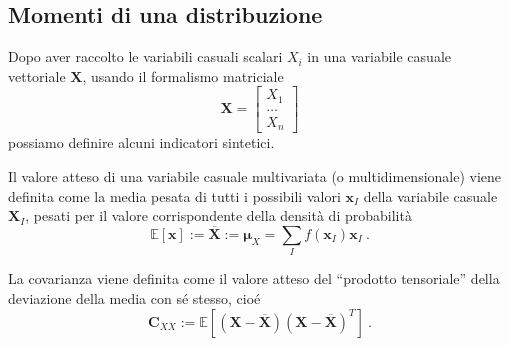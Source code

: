\subsection{Momenti di una distribuzione}
Dopo aver raccolto le variabili casuali scalari $X_i$ in una variabile casuale vettoriale $\mathbf{X}$, usando il formalismo matriciale
\begin{equation}
    \mathbf{X} = \begin{bmatrix}  X_1 \\ \dots  \\ X_n \end{bmatrix}
\end{equation}
possiamo definire alcuni indicatori sintetici. 

\begin{definition}
Il valore atteso di una variabile casuale multivariata (o multidimensionale) viene definita come la media pesata di tutti i possibili valori $\mathbf{x}_I$ della variabile casuale $\mathbf{X}_I$, pesati per il valore corrispondente della densità di probabilità
\begin{equation}
    \mathbb{E}[\mathbf{x}] := \overline{\mathbf{X}} := \mathbf{\mu}_X = \sum_{I} f(\mathbf{x}_I) \mathbf{x}_I \ . 
\end{equation}
\end{definition}

\begin{definition}[Covarianza]
La covarianza viene definita come il valore atteso del ``prodotto tensoriale'' della deviazione della media con sé stesso, cioé
\begin{equation}
    \mathbf{C}_{XX} := \mathbb{E}[(\mathbf{X} - \overline{\mathbf{X}})(\mathbf{X} - \overline{\mathbf{X}})^T] \  .
\end{equation}
\end{definition}

